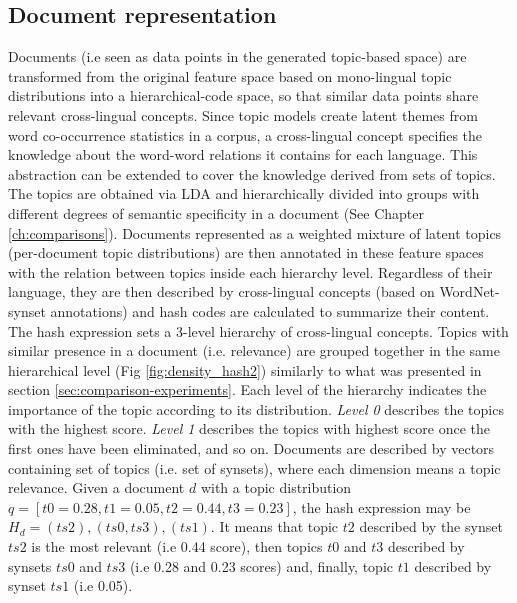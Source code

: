 \subsection{Document representation}
Documents (i.e seen as data points in the generated topic-based space) are transformed from the original feature space based on mono-lingual topic distributions into a hierarchical-code space, so that similar data points share relevant cross-lingual concepts. Since topic models create latent themes from word co-occurrence statistics in a corpus, a cross-lingual concept specifies the knowledge about the word-word relations it contains for each language. This abstraction can be extended to cover the knowledge derived from sets of topics. The topics are obtained via LDA and hierarchically divided into groups with different degrees of semantic specificity in a document (See Chapter \ref{ch:comparisons}). Documents represented as a weighted mixture of latent topics (per-document topic distributions) are then annotated in these feature spaces with the relation between topics inside each hierarchy level. Regardless of their language, they are then described by cross-lingual concepts (based on WordNet-synset annotations) and hash codes are calculated to summarize their content. The hash expression sets a 3-level hierarchy of cross-lingual concepts. Topics with similar presence in a document (i.e. relevance) are grouped together in the same hierarchical level (Fig \ref{fig:density_hash2}) similarly to what was presented in section \ref{sec:comparison-experiments}. Each level of the hierarchy indicates the importance of the topic according to its distribution. \textit{Level 0} describes the topics with the highest score. \textit{Level 1} describes the topics with highest score once the first ones have been eliminated, and so on. Documents are described by vectors containing set of topics (i.e. set of synsets), where each dimension means a topic relevance. Given a document $d$ with a topic distribution $q = [t0=0.28, t1=0.05, t2=0.44, t3=0.23]$, the hash expression may be $H_d = {(ts2), (ts0,ts3), (ts1)}$. It means that topic $t2$ described by the synset $ts2$ is the most relevant (i.e 0.44 score), then topics $t0$ and $t3$ described by synsets $ts0$ and $ts3$ (i.e 0.28 and 0.23 scores) and, finally, topic $t1$ described by synset $ts1$ (i.e 0.05).


